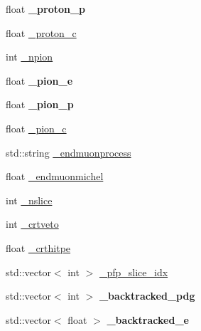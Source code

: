 \begin{DoxyCompactItemize}
\item 
float {\bfseries \+\_\+proton\+\_\+p}\hypertarget{classanalysis_1_1DefaultAnalysis_ab2da28c512097799b3509f3c800f8cc8}{}\label{classanalysis_1_1DefaultAnalysis_ab2da28c512097799b3509f3c800f8cc8}

\item 
float \hyperlink{classanalysis_1_1DefaultAnalysis_a643cc086bdfa4332ced72f6d4e5ce233}{\+\_\+proton\+\_\+c}
\item 
int \hyperlink{classanalysis_1_1DefaultAnalysis_a39a918abd4b60bf475907f5778ba5e9a}{\+\_\+npion}
\item 
float {\bfseries \+\_\+pion\+\_\+e}\hypertarget{classanalysis_1_1DefaultAnalysis_abb14ca7b3fab23d351343681ebe04e39}{}\label{classanalysis_1_1DefaultAnalysis_abb14ca7b3fab23d351343681ebe04e39}

\item 
float {\bfseries \+\_\+pion\+\_\+p}\hypertarget{classanalysis_1_1DefaultAnalysis_ab00137bb368e7d1e41814047aeb4a430}{}\label{classanalysis_1_1DefaultAnalysis_ab00137bb368e7d1e41814047aeb4a430}

\item 
float \hyperlink{classanalysis_1_1DefaultAnalysis_a9978effbcfba62536fc88a73fa985fe9}{\+\_\+pion\+\_\+c}
\item 
std\+::string \hyperlink{classanalysis_1_1DefaultAnalysis_a8cbb24a231e167258d2914f92bc4af22}{\+\_\+endmuonprocess}
\item 
float \hyperlink{classanalysis_1_1DefaultAnalysis_a3797bcb310074825add03ce03175fdc3}{\+\_\+endmuonmichel}
\item 
int \hyperlink{classanalysis_1_1DefaultAnalysis_a3eddf49910782afed7f324755fffe681}{\+\_\+nslice}
\item 
int \hyperlink{classanalysis_1_1DefaultAnalysis_a84ce9904fa527012a65c2be203a38d38}{\+\_\+crtveto}
\item 
float \hyperlink{classanalysis_1_1DefaultAnalysis_a900ec35e3ca4a00d4625a1e632bb6b40}{\+\_\+crthitpe}
\item 
std\+::vector$<$ int $>$ \hyperlink{classanalysis_1_1DefaultAnalysis_acbf0c279993cbefca72f38bc5e9f6627}{\+\_\+pfp\+\_\+slice\+\_\+idx}
\item 
std\+::vector$<$ int $>$ {\bfseries \+\_\+backtracked\+\_\+pdg}\hypertarget{classanalysis_1_1DefaultAnalysis_a28bd59dce75b8fd3be70bd4996354ae9}{}\label{classanalysis_1_1DefaultAnalysis_a28bd59dce75b8fd3be70bd4996354ae9}

\item 
std\+::vector$<$ float $>$ {\bfseries \+\_\+backtracked\+\_\+e}\hypertarget{classanalysis_1_1DefaultAnalysis_a2c16b4988d0bccf8b7ef96a52c173b80}{}\label{classanalysis_1_1DefaultAnalysis_a2c16b4988d0bccf8b7ef96a52c173b80}


\end{DoxyCompactItemize}

